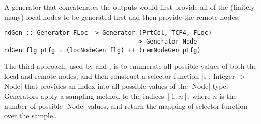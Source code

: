 A generator that concatenates the outputs would first provide all of the (finitely many) local nodes to be generated first
and then provide the remote nodes.  

\begin{lstlisting}
ndGen :: Generator FLoc -> Generator (PrtCol, TCP4, FLoc) 
                                    -> Generator Node
ndGen flg ptfg = (locNodeGen flg) ++ (remNodeGen ptfg)
\end{lstlisting}

The third approach, used by \GC and \FEAT,
is to enumerate all possible values of both the local and remote nodes,
and then construct a selector function |s : Integer -> Node|
that provides an index into all possible values of the |Node| type.
Generators apply a sampling method to the indices $[1..n]$,
where $n$ is the number of possible |Node| values,
and return the mapping of selector function over the sample..
